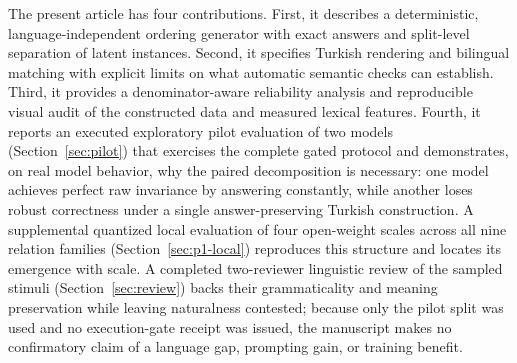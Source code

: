The present article has four contributions. First, it describes a deterministic, language-independent
ordering generator with exact answers and split-level separation of latent instances. Second, it specifies
Turkish rendering and bilingual matching with explicit limits on what automatic semantic checks can
establish. Third, it provides a denominator-aware reliability analysis and reproducible visual audit of the
constructed data and measured lexical features. Fourth, it reports an executed exploratory pilot evaluation
of two models (Section~\ref{sec:pilot}) that exercises the complete gated protocol and demonstrates, on
real model behavior, why the paired decomposition is necessary: one model achieves perfect raw invariance
by answering constantly, while another loses robust correctness under a single answer-preserving Turkish
construction. A supplemental quantized local evaluation of four open-weight scales across all nine
relation families (Section~\ref{sec:p1-local}) reproduces this structure and locates its emergence with
scale. A completed two-reviewer linguistic review of the sampled stimuli
(Section~\ref{sec:review}) backs their grammaticality and meaning preservation while leaving
naturalness contested; because only the pilot split was used and no execution-gate receipt was issued,
the manuscript makes no confirmatory claim of a language gap, prompting gain, or training benefit.
